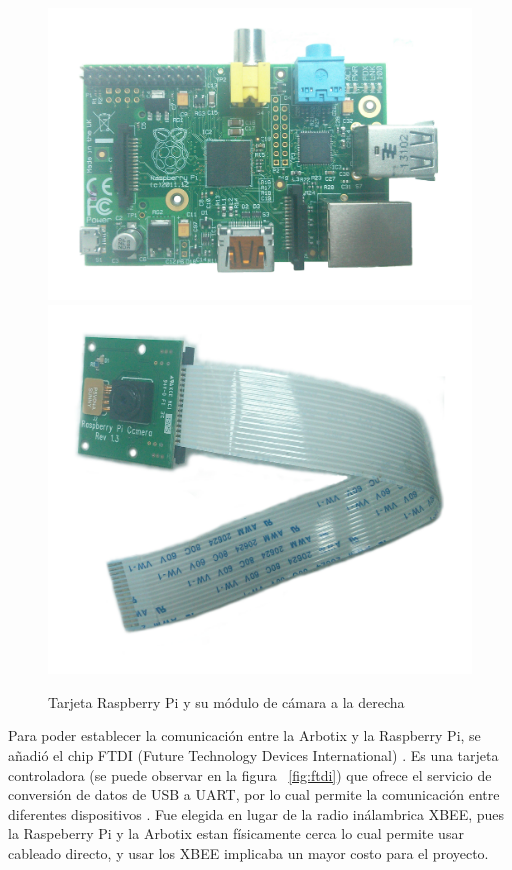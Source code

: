 
\begin{figure}[hbtp]
\centering
\includegraphics[scale=0.06]{imagenes/RaspberryPi.jpg}
\includegraphics[scale=0.06]{imagenes/CamRasp.jpg}
\caption{Tarjeta Raspberry Pi y su módulo de cámara a la derecha}
\label{fig:RaspYcamara}
\end{figure}

Para poder establecer la comunicación entre la Arbotix y la Raspberry Pi, se añadió el chip FTDI (Future Technology Devices International) \cite{ftdi}. Es una tarjeta controladora  (se puede observar en la figura ~\ref{fig:ftdi}) que ofrece el servicio de conversión de  datos de \gls{USB} a \gls{UART}, por lo cual permite la comunicación entre diferentes dispositivos \cite{ftdi}. Fue elegida en lugar de la radio inálambrica \gls{XBEE}, pues la Raspeberry Pi y la Arbotix estan f\'isicamente cerca lo cual permite usar cableado directo, y usar los \gls{XBEE} implicaba un mayor costo para el proyecto.

